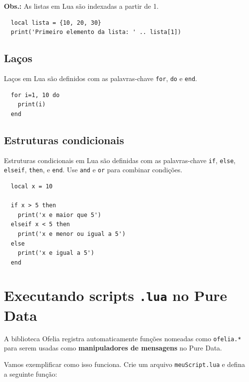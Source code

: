 \documentclass{article}
\begin{document}
\textbf{Obs.:} As listas em Lua são indexadas a partir de 1.

\begin{center}
  \begin{lstlisting}
  local lista = {10, 20, 30}
  print('Primeiro elemento da lista: ' .. lista[1])
  \end{lstlisting}
\end{center}

\subsection{Laços}

Laços em Lua são definidos com as palavras-chave \texttt{for}, \texttt{do} e \texttt{end}.

\begin{center}
  \begin{lstlisting}
  for i=1, 10 do
    print(i)
  end
  \end{lstlisting}
\end{center}

\subsection{Estruturas condicionais}

Estruturas condicionais em Lua são definidas com as palavras-chave \texttt{if}, \texttt{else}, \texttt{elseif}, \texttt{then}, e \texttt{end}.
Use \texttt{and} e \texttt{or} para combinar condições.

\begin{center}
  \begin{lstlisting}
  local x = 10

  if x > 5 then
    print('x e maior que 5')
  elseif x < 5 then
    print('x e menor ou igual a 5')
  else
    print('x e igual a 5')
  end
  \end{lstlisting}
\end{center}

\section{Executando scripts \texttt{.lua} no Pure Data}

A biblioteca Ofelia registra automaticamente funções nomeadas como \texttt{ofelia.*} para serem usadas como \textbf{manipuladores de mensagens} no Pure Data.

Vamos exemplificar como isso funciona.
Crie um arquivo \texttt{meuScript.lua} e defina a seguinte função:
\end{document}
